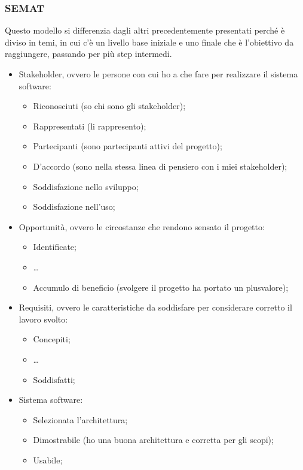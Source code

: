 \documentclass[../main]{subfiles}
\begin{document}
\subsubsection{SEMAT}
Questo modello si differenzia dagli altri precedentemente presentati perché è diviso in temi, in cui c'è un livello base iniziale e uno finale che è l'obiettivo da raggiungere, passando per più step intermedi.
\begin{itemize}
    \item Stakeholder, ovvero le persone con cui ho a che fare per realizzare il sistema software:
    \begin{itemize}
        \item Riconosciuti (so chi sono gli stakeholder);
        \item Rappresentati (li rappresento);
        \item Partecipanti (sono partecipanti attivi del progetto);
        \item D'accordo (sono nella stessa linea di pensiero con i miei stakeholder);
        \item Soddisfazione nello sviluppo;
        \item Soddisfazione nell'uso;
    \end{itemize}
    \item Opportunità, ovvero le circostanze che rendono sensato il progetto:
    \begin{itemize}
        \item Identificate;
        \item \dots
        \item Accumulo di beneficio (svolgere il progetto ha portato un plusvalore);
    \end{itemize}
    \item Requisiti, ovvero le caratteristiche da soddisfare per considerare corretto il lavoro svolto:
    \begin{itemize}
        \item Concepiti;
        \item \dots
        \item Soddisfatti;
    \end{itemize}
    \item Sistema software:
    \begin{itemize}
        \item Selezionata l'architettura;
        \item Dimostrabile (ho una buona architettura e corretta per gli scopi);
        \item Usabile;

\end{itemize}
\end{itemize}
\end{document}
